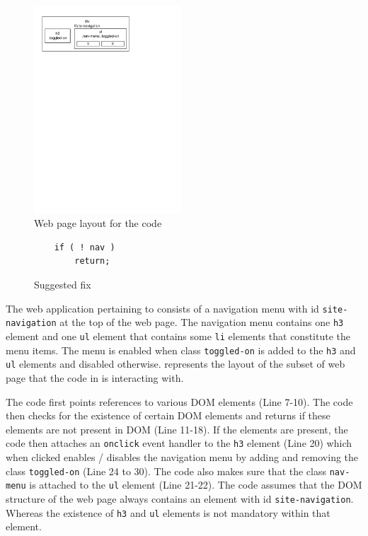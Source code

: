 	\begin{figure}
		\centering
		\includegraphics[width=55mm]{images/layout.pdf}
		\caption{Web page layout for the \javascript code}
		\label{Fig:Layout}
	\end{figure}

	\begin{figure}
	\medskip
	\begin{lstlisting}
	if ( ! nav )
		return;
	\end{lstlisting}
	\caption{Suggested fix}
	\label{Fig:Fix}
	\end{figure}
	
	The web application pertaining to  consists of a navigation menu with id \texttt{site-navigation} at the top of the web page. The navigation menu contains one \texttt{h3} element and one \texttt{ul} element that contains some \texttt{li} elements that constitute the menu items. The menu is enabled when class \texttt{toggled-on} is added to the \texttt{h3} and \texttt{ul} elements and disabled otherwise.  represents the layout of the subset of web page that the \javascript code in  is interacting with.
	
	The \javascript code first points references to various DOM elements (Line 7-10). The code then checks for the existence of certain DOM elements and returns if these elements are not present in DOM (Line 11-18). If the elements are present, the code then attaches an \texttt{onclick} event handler to the \texttt{h3} element (Line 20) which when clicked enables / disables the navigation menu by adding and removing the class \texttt{toggled-on} (Line 24 to 30). The code also makes sure that the class \texttt{nav-menu} is attached to the \texttt{ul} element (Line 21-22). The \javascript code assumes that the DOM structure of the web page always contains an element with id \texttt{site-navigation}. Whereas the existence of \texttt{h3} and \texttt{ul} elements is not mandatory within that element.
		
